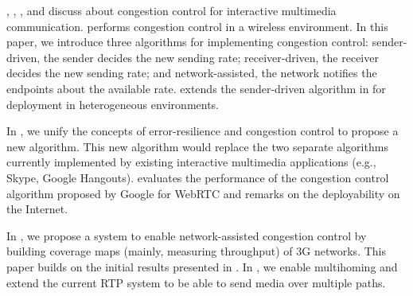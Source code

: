 , , , and 
discuss about congestion control for interactive multimedia communication.
 performs congestion control in a wireless environment. In
this paper, we introduce three algorithms for implementing congestion control:
sender-driven, the sender decides the new sending rate; receiver-driven, the
receiver decides the new sending rate; and network-assisted, the network
notifies the endpoints about the available rate.  extends the
sender-driven algorithm in  for deployment in heterogeneous
environments.

In , we unify the concepts of error-resilience and congestion
control to propose a new algorithm. This new algorithm would replace the two
separate algorithms currently implemented by existing interactive multimedia
applications (e.g., Skype, Google Hangouts).  evaluates the
performance of the congestion control algorithm proposed by Google for WebRTC
and remarks on the deployability on the Internet.


In , we propose a system to enable network-assisted
congestion control by building coverage maps (mainly, measuring throughput) of
3G networks. This paper builds on the initial results presented in
. In , we enable multihoming and extend the
current RTP system to be able to send media over multiple paths.
